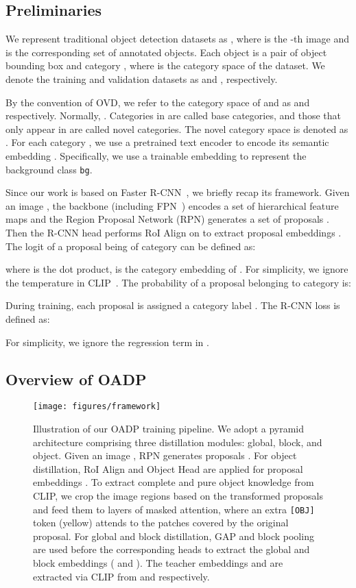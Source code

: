 \documentclass[10pt,twocolumn,letterpaper]{article}
\begin{document}
\subsection{Preliminaries}
\label{sec:preliminaries}

We represent traditional object detection datasets as , where  is the -th image and  is the corresponding set of annotated objects.
Each object  is a pair of object bounding box  and category , where  is the category space of the dataset.
We denote the training and validation datasets as  and , respectively.

By the convention of OVD, we refer to the category space of  and  as  and  respectively.
Normally, .
Categories in  are called base categories, and those that only appear in  are called novel categories.
The novel category space is denoted as .
For each category , we use a pretrained text encoder  to encode its semantic embedding .
Specifically, we use a trainable embedding  to represent the background class \texttt{bg}.

Since our work is based on Faster R-CNN~\cite{faster_rcnn}, we briefly recap its framework.
Given an image , the backbone (including FPN~\cite{fpn}) encodes a set of hierarchical feature maps  and the Region Proposal Network (RPN) generates a set of proposals .
Then the R-CNN head performs RoI Align on  to extract proposal embeddings .
The logit of a proposal  being of category  can be defined as:

where  is the dot product,  is the category embedding of .
For simplicity, we ignore the temperature  in CLIP~\cite{clip}.
The probability of a proposal  belonging to category  is:


During training, each proposal  is assigned a category label .
The R-CNN loss is defined as:

For simplicity, we ignore the regression term in .
 
\subsection{Overview of OADP}
\label{sec:overview_of_oadp}

\begin{figure*}[t]
  \centering
  \texttt{[image: figures/framework]}
  \caption{
  Illustration of our OADP training pipeline.
  We adopt a pyramid architecture comprising three distillation modules: global, block, and object.
  Given an image , RPN generates proposals .
  For object distillation, RoI Align and Object Head are applied for proposal embeddings .
  To extract complete and pure object knowledge from CLIP, we crop the image regions  based on the transformed proposals  and feed them to  layers of masked attention, where an extra \texttt{[OBJ]} token (yellow) attends to the patches covered by the original proposal.
  For global and block distillation, GAP and block pooling are used before the corresponding heads to extract the global and block embeddings ( and ).
  The teacher embeddings  and  are extracted via CLIP from  and  respectively.
  }
  \label{fig:framework}
\end{figure*}
\end{document}
